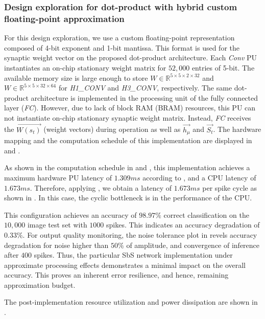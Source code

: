 \subsubsection{Design exploration for dot-product with hybrid custom floating-point approximation}
For this design exploration, we use a custom floating-point representation composed of 4-bit exponent and 1-bit mantissa. This format is used for the synaptic weight vector on the proposed dot-product architecture. Each \emph{Conv} PU instantiates an on-chip stationary weight matrix for $52,000$ entries of 5-bit. The available memory size is large enough to store $W\in\mathbb{R}^{5\times 5\times 2\times 32}$ and $W\in\mathbb{R}^{5\times 5\times 32\times 64}$ for \emph{H1\_CONV} and \emph{H3\_CONV}, respectively. The same dot-product architecture is implemented in the processing unit of the fully connected layer (\emph{FC}). However, due to lack of block RAM (BRAM) resources, this PU can not instantiate on-chip stationary synaptic weight matrix. Instead, \emph{FC} receives the $\vec{W(s_t)}$ (weight vectors) during operation as well as $\vec{h_\mu}$ and $\vec{S_t}$. The hardware mapping and the computation schedule of this implementation are displayed in  and .

As shown in the computation schedule in  and , this implementation achieves a maximum hardware PU latency of $1.309 ms$ according to , and a CPU latency of $1.673 ms$. Therefore, applying , we obtain a latency of $1.673 ms$ per spike cycle as shown in . In this case, the cyclic bottleneck is in the performance of the CPU.

This configuration achieves an accuracy of $98.97\%$ correct classification on the $10,000$ image test set with $1000$ spikes. This indicates an accuracy degradation of $0.33\%$. For output quality monitoring, the noise tolerance plot in  revels accuracy degradation for noise higher than $50\%$ of amplitude, and convergence of inference after $400$ spikes. Thus, the particular SbS network implementation under approximate processing effects demonstrates a minimal impact on the overall accuracy. This proves an inherent error resilience, and hence, remaining approximation budget.

The post-implementation resource utilization and power dissipation are shown in .

